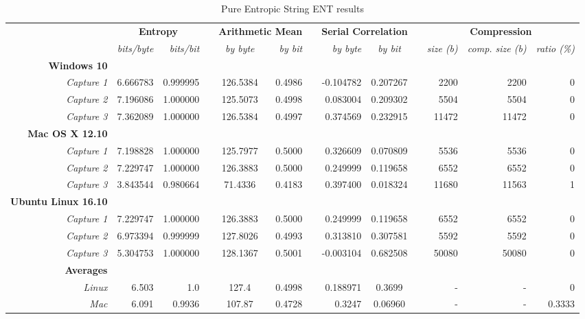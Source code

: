 \documentclass{IEEEtran}
\begin{document}
\begin{table}[h!]
\begin{adjustwidth}{-1.25 cm}{}
\centering
\caption{Pure Entropic String ENT results}
\begin{tabular}{@{}rrrrcrrrcrrrr@{}}\toprule
& \multicolumn{2}{c}{\textbf{Entropy}} & \phantom{abc}& \multicolumn{2}{c}{\textbf{Arithmetic Mean}} &
\phantom{abc} & \multicolumn{2}{c}{\textbf{Serial Correlation}} & \phantom{abc} &\multicolumn{3}{c}{\textbf{Compression}}\\
\cmidrule{2-3} \cmidrule{5-6} \cmidrule{8-9} \cmidrule{11-13}
& \textit{bits/byte} & \textit{bits/bit}  && \textit{by byte} & \textit{by bit} && \textit{by byte} & \textit{by bit} && \textit{size (b)} & \textit{comp. size (b)} & \textit{ratio (\%)}\\ \midrule
\textbf{Windows 10}\\
\textit{Capture 1} & 6.666783 & 0.999995  && 126.5384 & 0.4986  && -0.104782 & 0.207267 && 2200 & 2200 & 0\\
\textit{Capture 2}& 7.196086& 1.000000&& 125.5073& 0.4998&& 0.083004& 0.209302 && 5504 & 5504 & 0\\
\textit{Capture 3}& 7.362089& 1.000000&& 126.5384& 0.4997&& 0.374569& 0.232915 && 11472 & 11472 & 0\\
\textbf{Mac OS X 12.10}\\
\textit{Capture 1} & 7.198828 & 1.000000  && 125.7977 & 0.5000 && 0.326609 & 0.070809 && 5536 & 5536 & 0 \\
\textit{Capture 2}& 7.229747& 1.000000&& 126.3883& 0.5000&& 0.249999& 0.119658 && 6552 & 6552 & 0\\
\textit{Capture 3}& 3.843544& 0.980664&& 71.4336& 0.4183&& 0.397400&  0.018324 && 11680 & 11563 & 1 \\
\textbf{Ubuntu Linux 16.10}\\
\textit{Capture 1} & 7.229747 & 1.000000  && 126.3883 & 0.5000 && 0.249999 & 0.119658 && 6552 & 6552 & 0 \\
\textit{Capture 2}& 6.973394& 0.999999&& 127.8026& 0.4993&& 0.313810& 0.307581 && 5592 & 5592 &0\\
\textit{Capture 3}& 5.304753& 1.000000&& 128.1367& 0.5001&&-0.003104& 0.682508&& 50080 & 50080 & 0\\
\bottomrule
\textbf{Averages}\\
\textit{Linux}& 6.503 & 1.0 && 127.4 &0.4998  && 0.188971  & 0.3699 && - & - & 0\\
\textit{Mac}& 6.091 & 0.9936&& 107.87 &0.4728 && 0.3247 & 0.06960 && - & - & 0.3333\\

\end{tabular}
\end{adjustwidth}
\end{table}
\end{document}
